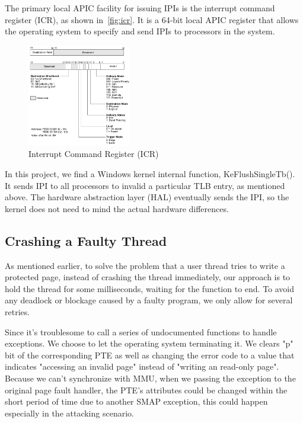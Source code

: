 The primary local APIC facility for issuing IPIs is the interrupt command register (ICR), as shown in~\autoref{fig:icr}. It is a 64-bit local APIC register that allows the operating system to specify and send IPIs to processors in the system.


\begin{figure}[th]
  \includegraphics[width=0.40\textwidth]{figures/icr}
  \centering
  \caption{Interrupt Command Register (ICR)}
  \label{fig:icr}
\end{figure}

In this project, we find a Windows kernel internal function, KeFlushSingleTb(). It sends IPI to all processors to invalid a particular TLB entry, as mentioned above. The hardware abstraction layer (HAL) eventually sends the IPI, so the kernel does not need to mind the actual hardware differences.


\subsection{Crashing a Faulty Thread}

As mentioned earlier, to solve the problem that a user thread tries to write a protected page, instead of crashing the thread immediately, our approach is to hold the thread for some milliseconds, waiting for the function to end. To avoid any deadlock or blockage caused by a faulty program, we only allow for several retries. 

Since it's troublesome to call a series of undocumented functions to handle exceptions. We choose to let the operating system terminating it. We clears "p" bit of the corresponding PTE as well as changing the error code to a value that indicates "accessing an invalid page" instead of "writing an read-only page". Because we can't synchronize with MMU, when we passing the exception to the original page fault handler, the PTE's attributes could be changed within the short period of time due to another SMAP exception, this could happen especially in the attacking scenario. 

